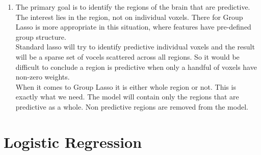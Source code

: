 \documentclass[11pt]{article}
\providecommand{\tightlist}{%
      \setlength{\itemsep}{0pt}\setlength{\parskip}{0pt}}
\begin{document}
    \begin{enumerate}
\def\labelenumi{\arabic{enumi}.}
\setcounter{enumi}{4}
\tightlist
\item
  The primary goal is to identify the regions of the brain that are
  predictive. The interest lies in the region, not on individual voxels.
  There for Group Lasso is more appropriate in this situation, where
  features have pre-defined group structure.\\
  Standard lasso will try to identify predictive individual voxels and
  the result will be a sparse set of vocels scattered across all
  regions. So it would be difficult to conclude a region is predictive
  when only a handful of voxels have non-zero weights.\\
  When it comes to Group Lasso it is either whole region or not. This is
  exactly what we need. The model will contain only the regions that are
  predictive as a whole. Non predictive regions are removed from the
  model.
\end{enumerate}

    \section{Logistic Regression}\label{logistic-regression}
\end{document}
